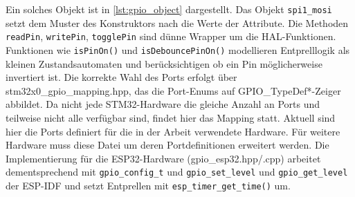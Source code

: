 Ein solches Objekt ist in \cref{lst:gpio_object} dargestellt.
Das Objekt \texttt{spi1\_mosi} setzt dem Muster des Konstruktors nach die Werte der Attribute.
Die Methoden \texttt{readPin}, \texttt{writePin}, \texttt{togglePin} sind dünne Wrapper um die HAL-Funktionen.
Funktionen wie \texttt{isPinOn()} und \texttt{isDebouncePinOn()} modellieren Entprelllogik als kleinen Zustandsautomaten und berücksichtigen ob ein Pin möglicherweise invertiert ist.
Die korrekte Wahl des Ports erfolgt über stm32x0\_gpio\_mapping.hpp, das die Port-Enums auf GPIO\_TypeDef*-Zeiger abbildet.
Da nicht jede STM32-Hardware die gleiche Anzahl an Ports und teilweise nicht alle verfügbar sind, findet hier das Mapping statt.
Aktuell sind hier die Ports definiert für die in der Arbeit verwendete Hardware.
Für weitere Hardware muss diese Datei um deren Portdefinitionen erweitert werden.
Die Implementierung für die ESP32-Hardware (gpio\_esp32.hpp/.cpp) arbeitet dementsprechend mit \texttt{gpio\_config\_t} und \texttt{gpio\_set\_level} und \texttt{gpio\_get\_level} der ESP-IDF und setzt Entprellen mit \texttt{esp\_timer\_get\_time()} um.

